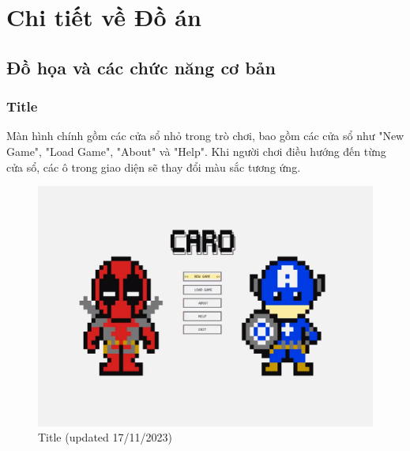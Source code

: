 \section{Chi tiết về Đồ án}

\subsection{Đồ họa và các chức năng cơ bản}

\subsubsection{Title}
Màn hình chính gồm các cửa sổ nhỏ trong trò chơi, bao gồm các cửa sổ như "New Game", "Load Game", "About" và "Help". Khi người chơi điều hướng đến từng cửa sổ, các ô trong giao diện sẽ thay đổi màu sắc tương ứng.
\begin{figure}[H]
    \centering
    \includegraphics[scale=.5]{img/title.png}
    \caption{Title (updated 17/11/2023)}
\end{figure}
\clearpage
